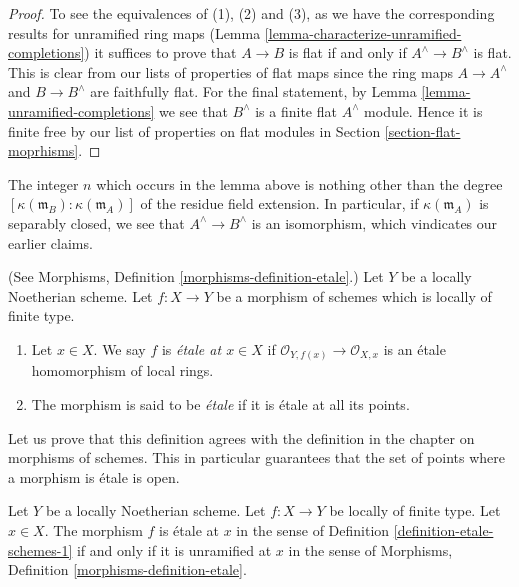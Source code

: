 \begin{proof}
To see the equivalences of (1), (2) and (3), as we have the corresponding
results for unramified ring maps
(Lemma \ref{lemma-characterize-unramified-completions})
it suffices to prove that
$A \to B$ is flat if and only if $A^\wedge \to B^\wedge$ is flat.
This is clear from our lists of properties of flat maps since
the ring maps $A \to A^\wedge$ and $B \to B^\wedge$ are faithfully flat.
For the final statement, by Lemma \ref{lemma-unramified-completions}
we see that $B^\wedge$ is a finite flat $A^\wedge$ module.
Hence it is finite free by our list
of properties on flat modules in Section \ref{section-flat-moprhisms}.
\end{proof}

\noindent
The integer $n$ which occurs in the lemma above
is nothing other than the degree
$[\kappa(\mathfrak m_B) : \kappa(\mathfrak m_A)]$ of the residue field
extension. In particular, if $\kappa(\mathfrak m_A)$
is separably closed, we see that $A^\wedge \to B^\wedge$
is an isomorphism, which vindicates our earlier claims.

\begin{definition}
\label{definition-etale-schemes-1}
(See Morphisms, Definition \ref{morphisms-definition-etale}.)
Let $Y$ be a locally Noetherian scheme.
Let $f : X \to Y$ be a morphism of schemes which is locally of finite type.
\begin{enumerate}
\item Let $x \in X$. We say $f$ is {\it \'etale at $x \in X$} if
$\mathcal{O}_{Y, f(x)} \to \mathcal{O}_{X, x}$ is an
\'etale homomorphism of local rings.
\item The morphism is said to be {\it \'etale} if it is \'etale at all its
points.
\end{enumerate}
\end{definition}

\noindent
Let us prove that this definition agrees with the definition in the
chapter on morphisms of schemes. This in particular guarantees that the
set of points where a morphism is \'etale is open.

\begin{lemma}
\label{lemma-etale-defintion}
Let $Y$ be a locally Noetherian scheme.
Let $f : X \to Y$ be locally of finite type.
Let $x \in X$. The morphism $f$ is \'etale at $x$ in
the sense of Definition \ref{definition-etale-schemes-1}
if and only if it is unramified at $x$ in
the sense of Morphisms, Definition \ref{morphisms-definition-etale}.
\end{lemma}

